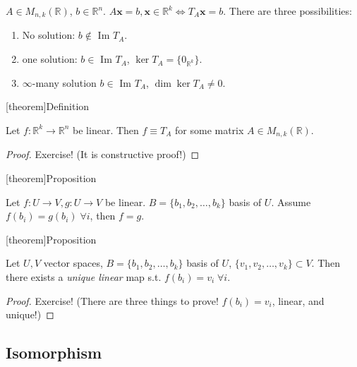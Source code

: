 \documentclass[12pt]{report}
\theoremstyle{definition}
\begin{document}
\begin{ex}
    $A \in M_{n,k}(\mathbb{R})$, $b \in \mathbb{R}^{n}$.
    $A\mathbf{x} = b, \mathbf{x} \in \mathbb{R}^{k} \iff T_A \mathbf{x} = b$.
    There are three possibilities:
    \begin{enumerate}[label = (\arabic*)]
        \item No solution: $b \notin $ Im $T_A$.
        \item one solution: $b \in$ Im $T_A$, $\ker{T_A} = \{0_{\mathbb{R}^{k}}\}$.
        \item $\infty$-many solution $b \in$ Im $T_A$, $\dim{\ker{T_A}} \neq 0$.
    \end{enumerate}
\end{ex}

[theorem]{Definition}
\begin{linear map has a matrix representation}
    Let $f:\mathbb{R}^{k} \rightarrow{} \mathbb{R}^{n}$ be linear.
    Then $f \equiv T_A$ for some matrix $A \in M_{n,k}(\mathbb{R})$.
\end{linear map has a matrix representation}

\begin{proof}
   Exercise! (It is constructive proof!)
\end{proof}

[theorem]{Proposition}
\begin{same basis tranformed implies same linear map}
    Let $f:U\rightarrow{}V, g:U\rightarrow{}V$ be linear.
    $B = \{b_1, b_2,\ldots,b_k\}$ basis of $U$.
    Assume $f(b_i) = g(b_i) \;\forall i$, then $f = g$.
\end{same basis tranformed implies same linear map}

[theorem]{Proposition}
\begin{sdfsdf}
    Let $U,V$ vector spaces, $B = \{b_1, b_2,\ldots,b_k\}$ basis of $U$,
    $\{v_1, v_2,\ldots,v_k\} \subset V$.
    Then there exists a \emph{unique linear} map s.t. $f(b_i) = v_i \;\forall i$.
\end{sdfsdf}

\begin{proof}
    Exercise! (There are three things to prove! $f(b_i) = v_i$, linear, and unique!)
\end{proof}

\subsection{Isomorphism}
\end{document}
